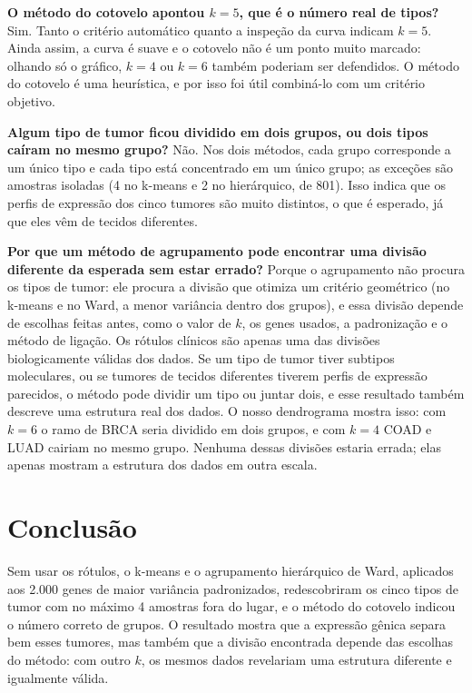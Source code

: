 \documentclass[11pt,a4paper]{article}
\begin{document}
\textbf{O método do cotovelo apontou $k=5$, que é o número real de tipos?}
Sim. Tanto o critério automático quanto a inspeção da curva indicam $k=5$. Ainda assim, a curva é suave e o
cotovelo não é um ponto muito marcado: olhando só o gráfico, $k=4$ ou $k=6$ também poderiam ser defendidos.
O método do cotovelo é uma heurística, e por isso foi útil combiná-lo com um critério objetivo.

\textbf{Algum tipo de tumor ficou dividido em dois grupos, ou dois tipos caíram no mesmo grupo?}
Não. Nos dois métodos, cada grupo corresponde a um único tipo e cada tipo está concentrado em um único grupo;
as exceções são amostras isoladas (4 no k-means e 2 no hierárquico, de 801). Isso indica que os perfis de
expressão dos cinco tumores são muito distintos, o que é esperado, já que eles vêm de tecidos diferentes.

\textbf{Por que um método de agrupamento pode encontrar uma divisão diferente da esperada sem estar errado?}
Porque o agrupamento não procura os tipos de tumor: ele procura a divisão que otimiza um critério geométrico
(no k-means e no Ward, a menor variância dentro dos grupos), e essa divisão depende de escolhas feitas antes,
como o valor de $k$, os genes usados, a padronização e o método de ligação. Os rótulos clínicos são apenas uma
das divisões biologicamente válidas dos dados. Se um tipo de tumor tiver subtipos moleculares, ou se tumores
de tecidos diferentes tiverem perfis de expressão parecidos, o método pode dividir um tipo ou juntar dois, e
esse resultado também descreve uma estrutura real dos dados. O nosso dendrograma mostra isso: com $k=6$ o ramo
de BRCA seria dividido em dois grupos, e com $k=4$ COAD e LUAD cairiam no mesmo grupo. Nenhuma dessas divisões
estaria errada; elas apenas mostram a estrutura dos dados em outra escala.

\section{Conclusão}

Sem usar os rótulos, o k-means e o agrupamento hierárquico de Ward, aplicados aos 2.000 genes de maior variância
padronizados, redescobriram os cinco tipos de tumor com no máximo 4 amostras fora do lugar, e o método do
cotovelo indicou o número correto de grupos. O resultado mostra que a expressão gênica separa bem esses tumores,
mas também que a divisão encontrada depende das escolhas do método: com outro $k$, os mesmos dados revelariam
uma estrutura diferente e igualmente válida.
\end{document}
